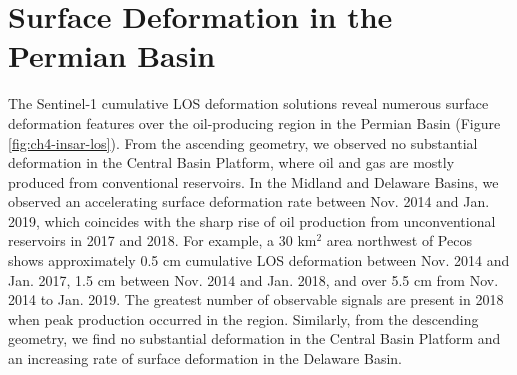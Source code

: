 




%


\section{Surface Deformation in the Permian Basin}
\label{sec:ch4-results-defo}


The Sentinel-1 cumulative LOS deformation solutions reveal numerous surface deformation features over the oil-producing region in the Permian Basin (Figure \ref{fig:ch4-insar-los}). From the ascending geometry, we observed no substantial deformation in the Central Basin Platform, where oil and gas are mostly produced from conventional reservoirs. In the Midland and Delaware Basins, we observed an accelerating surface deformation rate between Nov. 2014 and Jan. 2019, which coincides with the sharp rise of oil production from unconventional reservoirs in 2017 and 2018. For example, a 30 km$^2 $ area northwest of Pecos shows approximately 0.5 cm cumulative LOS deformation between Nov. 2014 and Jan. 2017, 1.5 cm between Nov. 2014 and Jan. 2018, and over 5.5 cm from Nov. 2014 to Jan. 2019. The greatest number of observable signals are present in 2018 when peak production occurred in the region. Similarly, from the descending geometry, we find no substantial deformation in the Central Basin Platform and an increasing rate of surface deformation in the Delaware Basin. 


